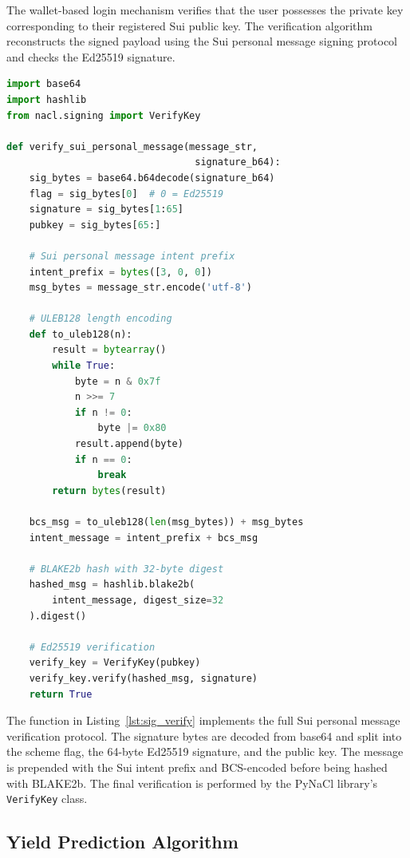 The wallet-based login mechanism verifies that the user possesses the private key corresponding to their registered Sui public key. The verification algorithm reconstructs the signed payload using the Sui personal message signing protocol and checks the Ed25519 signature.

\noindent\begin{minipage}{\textwidth}
\begin{lstlisting}[language=Python, caption={Sui Personal Message Signature Verification}, label={lst:sig_verify}]
import base64
import hashlib
from nacl.signing import VerifyKey

def verify_sui_personal_message(message_str,
                                 signature_b64):
    sig_bytes = base64.b64decode(signature_b64)
    flag = sig_bytes[0]  # 0 = Ed25519
    signature = sig_bytes[1:65]
    pubkey = sig_bytes[65:]

    # Sui personal message intent prefix
    intent_prefix = bytes([3, 0, 0])
    msg_bytes = message_str.encode('utf-8')

    # ULEB128 length encoding
    def to_uleb128(n):
        result = bytearray()
        while True:
            byte = n & 0x7f
            n >>= 7
            if n != 0:
                byte |= 0x80
            result.append(byte)
            if n == 0:
                break
        return bytes(result)

    bcs_msg = to_uleb128(len(msg_bytes)) + msg_bytes
    intent_message = intent_prefix + bcs_msg

    # BLAKE2b hash with 32-byte digest
    hashed_msg = hashlib.blake2b(
        intent_message, digest_size=32
    ).digest()

    # Ed25519 verification
    verify_key = VerifyKey(pubkey)
    verify_key.verify(hashed_msg, signature)
    return True
\end{lstlisting}
\end{minipage}

The function in Listing~\ref{lst:sig_verify} implements the full Sui personal message verification protocol. The signature bytes are decoded from base64 and split into the scheme flag, the 64-byte Ed25519 signature, and the public key. The message is prepended with the Sui intent prefix and BCS-encoded before being hashed with BLAKE2b. The final verification is performed by the PyNaCl library's \texttt{VerifyKey} class.

\subsection{Yield Prediction Algorithm}

